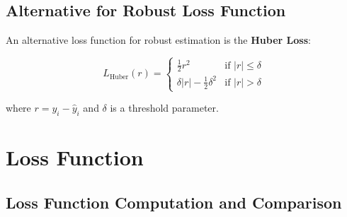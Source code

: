 \documentclass[12pt]{article}
\begin{document}
\subsection{Alternative for Robust Loss Function}

An alternative loss function for robust estimation is the \textbf{Huber Loss}:

\begin{equation}
L_{\text{Huber}}(r) = \begin{cases}
\frac{1}{2}r^2 & \text{if } |r| \leq \delta \\
\delta|r| - \frac{1}{2}\delta^2 & \text{if } |r| > \delta
\end{cases}
\label{eq:huber_loss}
\end{equation}

where $r = y_i - \hat{y}_i$ and $\delta$ is a threshold parameter.

\section{Loss Function}





\subsection{Loss Function Computation and Comparison}
\end{document}
